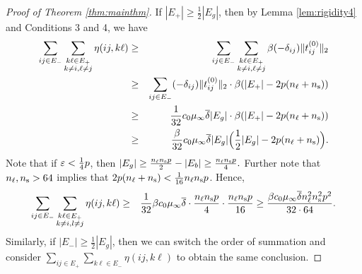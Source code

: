 \begin{proof}[Proof of Theorem \ref{thm:mainthm}]
If $|E_+| \ge \frac{1}{2}|E_g|$, then 
by Lemma \ref{lem:rigidity4} and Conditions 3 and 4, we have 
\begin{eqnarray*}
	\sum_{ij\in E_{-}}\sum_{\substack{k\ell\in E_{+}\\k\neq i, \ell \neq j}}\eta(ij,k\ell) 
	& \ge & \sum_{ij\in E_{-}}\sum_{\substack{k\ell\in E_{+}\\k\neq i, \ell \neq j}}\beta(-\delta_{ij})\|t_{ij}^{(0)}\|_2\\
	& \ge & \sum_{ij\in E_{-}}(-\delta_{ij})\|t_{ij}^{(0)}\|_2\cdot \beta(|E_{+}| - 2 p (n_\ell + n_\text{s}) ) \\
	& \ge & \frac{1}{32}c_{0}\mu_{\infty} \overline{\delta}|E_{g}| \cdot \beta (|E_{+}| - 2 p (n_\ell + n_\text{s}) ) \\
	& \ge & \frac{\beta}{32} c_{0} \mu_{\infty}\overline{\delta}|E_{g}| \Bigl(\frac{1}{2} | E_g| - 2 p (n_\ell + n_\text{s}) \Bigr).
\end{eqnarray*}
Note that if $\varepsilon < \frac{1}{4}p$, then $|E_g| \geq \frac{n_\ell n_\text{s} p}{2} - |E_b| \geq \frac{n_\ell n_\text{s} p}{4}.$
Further note that $n_\ell, n_\text{s} > 64$ implies that $2 p (n_\ell + n_\text{s}) < \frac{1}{16}n_\ell n_\text{s} p$.  Hence,
\begin{eqnarray*}
	\sum_{ij\in E_{-}}\sum_{\substack{k\ell\in E_{+}\\k\neq i, l \neq j}}\eta(ij,k\ell) 
	&\ge & 
	\frac{1}{32}\beta c_0 \mu_{\infty} \overline{\delta}\cdot \frac{n_\ell n_\text{s} p}{4} \cdot \frac{n_\ell n_\text{s} p}{16}
	\ge
	\frac{\beta c_0 \mu_{\infty} \overline{\delta} n_\ell^2 n_\text{s}^2 p^2}{32 \cdot 64}.
\end{eqnarray*}
Similarly, if $|E_-| \ge \frac{1}{2}|E_g|$, then we can switch the order of summation and
consider $\sum_{ij \in E_+} \sum_{k\ell \in E_-} \eta(ij, k\ell)$ to obtain the 
same conclusion.


\end{proof}
